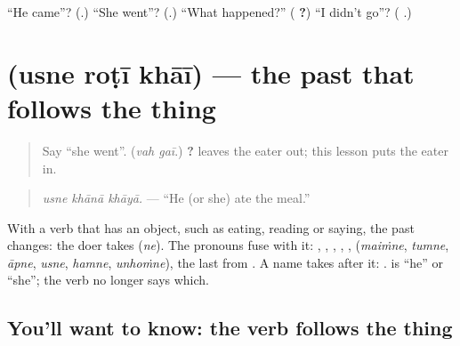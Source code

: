 \begin{tcolorbox}[breakable,colback=teal!4,colframe=teal!35!black,title={Before you move on}]
\textquotedblleft{}He came\textquotedblright{}? (\textbf{}.) \textquotedblleft{}She went\textquotedblright{}? (\textbf{}.) \textquotedblleft{}What happened?\textquotedblright{} (\textbf{ ?}) \textquotedblleft{}I didn't go\textquotedblright{}? (\textbf{  }.)
\end{tcolorbox}
\section[\texorpdfstring{\hi{उसने} \hi{रोटी} \hi{खाई} (usne roṭī khāī)}{उसने रोटी खाई (usne roṭī khāī)}]{   (usne roṭī khāī) — the past that follows the thing}

\label{lesson:HI-C276-usnekhai}



\begin{quote}
Say \textquotedblleft{}she went\textquotedblright{}. (\emph{vah gaī}.) \textbf{ ?} leaves the eater out; this lesson puts the eater in.
\end{quote}

\begin{grammarlens}[title={Grammar Lens: the doer takes \hi{ने}}]
\begin{quote}
\textbf{  }
\end{quote}

\begin{quote}
\emph{usne khānā khāyā.} — \textquotedblleft{}He (or she) ate the meal.\textquotedblright{}
\end{quote}

With a verb that has an object, such as eating, reading or saying, the past changes: the doer takes \textbf{} (\emph{ne}). The pronouns fuse with it: \textbf{}, \textbf{}, \textbf{}, \textbf{}, \textbf{}, \textbf{} (\emph{maiṁne}, \emph{tumne}, \emph{āpne}, \emph{usne}, \emph{hamne}, \emph{unhoṁne}), the last from \textbf{}. A name takes \textbf{} after it: \textbf{ }. \textbf{} is \textquotedblleft{}he\textquotedblright{} or \textquotedblleft{}she\textquotedblright{}; the verb no longer says which.
\end{grammarlens}

\subsection*{You'll want to know: the verb follows the thing}
\begin{quote}
\textbf{   }
\end{quote}

